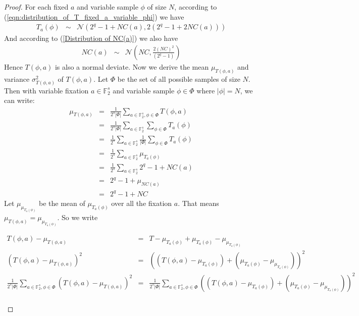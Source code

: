 \begin{proof}
For each fixed $a$ and variable sample $\phi$ of size $N$, according to (\ref{eqn:distribution_of_T_fixed_a_variable_phi}) we have 
\begin{eqnarray*}
T_{a}(\phi) &\sim & \mathcal{N}(2^q - 1 + NC(a),2(2^q -1 + 2NC(a)))
\end{eqnarray*}
And according to (\ref{Distribution of NC(a)}) we also have
\begin{eqnarray*}
NC(a) &\sim & \mathcal{N}\left(NC, \frac{2(NC)^2}{(2^q-1)}\right)
\end{eqnarray*} Hence $T\left(\phi,a\right)$ is also a normal deviate. Now we derive the mean $\mu_{T\left(\phi,a\right)}$ and variance $\sigma^2_{T\left(\phi,a\right)}$ of $T\left(\phi,a\right)$. Let $\Phi$ be the set of all possible samples of size $N$. Then with variable fixation $a \in \mathbb{F}_{2}^{s}$ and variable sample $\phi \in \Phi$ where $|\phi|= N$, we can write:
\begin{eqnarray*}
\mu_{T\left(\phi,a\right)} &=& \frac{1}{2^s|\Phi|}\displaystyle\sum_{a \in \mathbb{F}_{2}^s, \phi \in \Phi}T\left(\phi,a\right) \\
&=& \frac{1}{2^s|\Phi|}\displaystyle\sum_{a \in \mathbb{F}_{2}^s}\displaystyle\sum_{\phi \in \Phi}T_{a}(\phi) \\
&=& \frac{1}{2^s}\displaystyle\sum_{a \in \mathbb{F}_{2}^s}\frac{1}{|\Phi|}\displaystyle\sum_{\phi \in \Phi}T_{a}(\phi)\\
&=& \frac{1}{2^s}\displaystyle\sum_{a \in \mathbb{F}_{2}^s}\mu_{T_{a}(\phi)}\\
&=& \frac{1}{2^s}\displaystyle\sum_{a \in \mathbb{F}_{2}^s}2^q -1 + NC(a)\\
&=& 2^q -1 + \mu_{NC(a)}\\
&=& 2^q -1 + NC
\end{eqnarray*}
Let $\mu_{\mu_{T_{a}(\phi)}}$ be the mean of $\mu_{T_{a}(\phi)}$ over all the fixation $a$. That means  $\mu_{T\left(\phi,a\right)} = \mu_{\mu_{T_{a}(\phi)}}$. So we write 
\begin{scriptsize}
\begin{eqnarray*}
T\left(\phi,a\right) - \mu_{T\left(\phi,a\right)} &=& T - \mu_{T_{a}(\phi)} + \mu_{T_{a}(\phi)} - \mu_{\mu_{T_{a}(\phi)}}\\
\left(T\left(\phi,a\right) - \mu_{T\left(\phi,a\right)}\right)^2 &=& \left((T\left(\phi,a\right) - \mu_{T_{a}(\phi)}) + (\mu_{T_{a}(\phi)} - \mu_{\mu_{T_{a}(\phi)}})\right)^2\\
\frac{1}{2^{s}|\Phi|}\displaystyle\sum_{a \in \mathbb{F}_{2}^{s},\phi \in \Phi}(T\left(\phi,a\right) - \mu_{T\left(\phi,a\right)})^2 &=& \frac{1}{2^{s}|\Phi|}\displaystyle\sum_{a \in \mathbb{F}_{2}^{s},\phi \in \Phi}\left((T\left(\phi,a\right) - \mu_{T_{a}(\phi)}) + (\mu_{T_{a}(\phi)} - \mu_{\mu_{T_{a}(\phi)}})\right)^2\\

\end{eqnarray*}
\end{scriptsize}
\end{proof}
